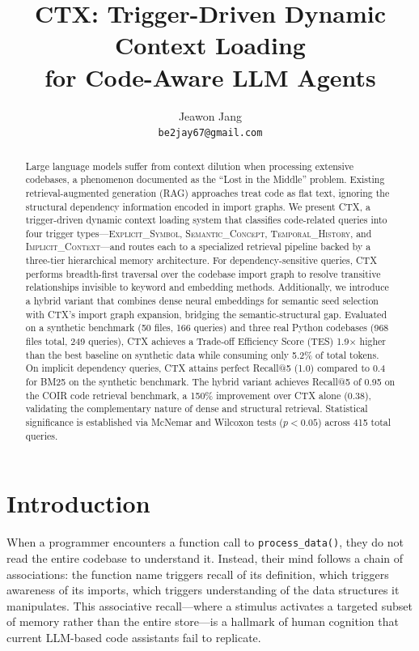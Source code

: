 \documentclass[11pt]{article}
\title{CTX: Trigger-Driven Dynamic Context Loading\\for Code-Aware LLM Agents}
\author{Jeawon Jang \\ \texttt{be2jay67@gmail.com}}
\begin{document}
\maketitle

\begin{abstract}
Large language models suffer from context dilution when processing extensive codebases, a phenomenon documented as the ``Lost in the Middle'' problem. Existing retrieval-augmented generation (RAG) approaches treat code as flat text, ignoring the structural dependency information encoded in import graphs. We present CTX, a trigger-driven dynamic context loading system that classifies code-related queries into four trigger types---\textsc{Explicit\_Symbol}, \textsc{Semantic\_Concept}, \textsc{Temporal\_History}, and \textsc{Implicit\_Context}---and routes each to a specialized retrieval pipeline backed by a three-tier hierarchical memory architecture. For dependency-sensitive queries, CTX performs breadth-first traversal over the codebase import graph to resolve transitive relationships invisible to keyword and embedding methods. Additionally, we introduce a hybrid variant that combines dense neural embeddings for semantic seed selection with CTX's import graph expansion, bridging the semantic-structural gap. Evaluated on a synthetic benchmark (50 files, 166 queries) and three real Python codebases (968 files total, 249 queries), CTX achieves a Trade-off Efficiency Score (TES) 1.9$\times$ higher than the best baseline on synthetic data while consuming only 5.2\% of total tokens. On implicit dependency queries, CTX attains perfect Recall@5 (1.0) compared to 0.4 for BM25 on the synthetic benchmark. The hybrid variant achieves Recall@5 of 0.95 on the COIR code retrieval benchmark, a 150\% improvement over CTX alone (0.38), validating the complementary nature of dense and structural retrieval. Statistical significance is established via McNemar and Wilcoxon tests ($p<0.05$) across 415 total queries.
\end{abstract}

\section{Introduction}

When a programmer encounters a function call to \texttt{process\_data()}, they do not read the entire codebase to understand it. Instead, their mind follows a chain of associations: the function name triggers recall of its definition, which triggers awareness of its imports, which triggers understanding of the data structures it manipulates. This associative recall---where a stimulus activates a targeted subset of memory rather than the entire store---is a hallmark of human cognition that current LLM-based code assistants fail to replicate.
\end{document}
